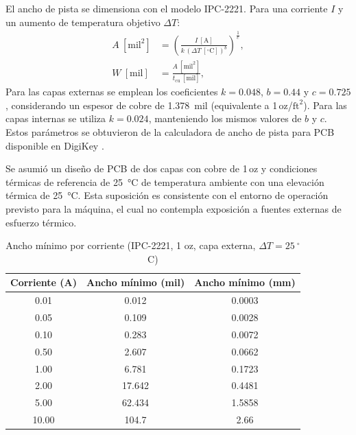     \noindent
    El ancho de pista se dimensiona con el modelo IPC-2221. Para una corriente \(I\) y un aumento de temperatura objetivo \(\Delta T\):
    \begin{align*}
      A~[\text{mil}^2] &= \left(\frac{I~[\text{A}]}{k\,(\Delta T~[^\circ\text{C}])^{b}}\right)^{\tfrac{1}{c}},\\
      W~[\text{mil}] &= \frac{A~[\text{mil}^2]}{t_\text{cu}~[\text{mil}]},
    \end{align*}
    Para las capas externas se emplean los coeficientes \(k=0.048\), \(b=0.44\) y \(c=0.725\), considerando un espesor de cobre de \SI{1.378}{mil} (equivalente a 1\,oz/\(\text{ft}^2\)). Para las capas internas se utiliza \(k=0.024\), manteniendo los mismos valores de \(b\) y \(c\). Estos parámetros se obtuvieron de la calculadora de ancho de pista para \ac{PCB} disponible en DigiKey \autocite{DigiKey_TraceWidth}.

    \noindent
    Se asumió un diseño de \ac{PCB} de dos capas con cobre de 1\,oz y condiciones térmicas de referencia de \SI{25}{\celsius} de temperatura ambiente con una elevación térmica de \SI{25}{\celsius}. Esta suposición es consistente con el entorno de operación previsto para la máquina, el cual no contempla exposición a fuentes externas de esfuerzo térmico.


    \begin{table}[H]
    \centering
    \caption{Ancho mínimo por corriente (IPC-2221, 1 oz, capa externa, $\Delta T=25~^\circ$C)}
    \label{tab:ancho_pista_ipc}
    \begin{tabular}{|c|c|c|}
    \hline
    Corriente (A) & Ancho mínimo (mil) & Ancho mínimo (mm) \\
    \hline
    0.01 & 0.012  & 0.0003 \\
    \hline
    0.05 & 0.109  & 0.0028 \\
    \hline
    0.10 & 0.283  & 0.0072 \\
    \hline
    0.50 & 2.607  & 0.0662 \\
    \hline
    1.00 & 6.781  & 0.1723 \\
    \hline
    2.00 & 17.642 & 0.4481 \\
    \hline
    5.00 & 62.434 & 1.5858 \\
    \hline
    10.00 & 104.7 & 2.66 \\
    \hline
    \end{tabular}
    \end{table}

